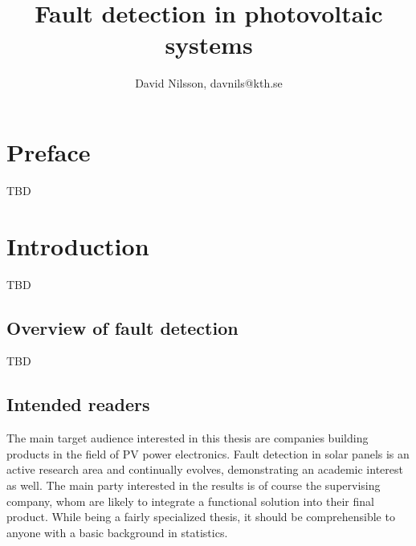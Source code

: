 


\title{Fault detection in photovoltaic systems}
\author{David Nilsson, davnils@kth.se}



\maketitle


\tableofcontents

\chapter*{Preface}
TBD

\printglossaries
\cleardoublepage
{}
\listoffigures
\clearpage
{}

\chapter{Introduction}
TBD

\section{Overview of fault detection}
TBD

\section{Intended readers}
The main target audience interested in this thesis are companies building products in the field of PV power electronics.
Fault detection in solar panels is an active research area and continually evolves, demonstrating an academic interest as well.
The main party interested in the results is of course the supervising company, whom are likely to
integrate a functional solution into their final product.
While being a fairly specialized thesis, it should be comprehensible to anyone with a basic background in statistics.

